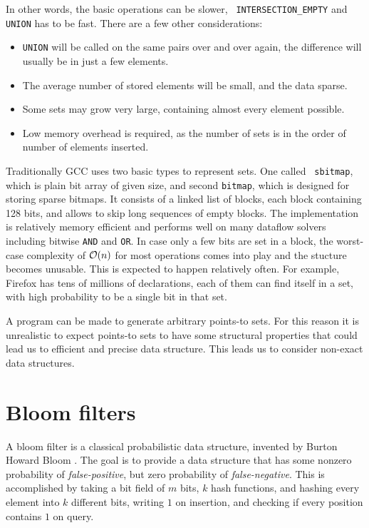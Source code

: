 In other words, the basic operations can be slower, {\tt
INTERSECTION\_EMPTY} and {\tt UNION} has to be fast. There are a few other considerations:

\begin{itemize}
	\item {\tt UNION} will be called on the same pairs over and over again,
		the difference will usually be in just a few elements.
	\item The average number of stored elements will be small, and the data sparse.
	\item Some sets may grow very large, containing almost every element possible.
	\item Low memory overhead is required, as the number of sets is in the order
		of number of elements inserted.
\end{itemize}


Traditionally GCC uses two basic types to represent sets. One called {\tt
sbitmap}, which is plain bit array of given size, and second {\tt bitmap}, which
is designed for storing sparse bitmaps. It consists of a linked list of blocks,
each block containing 128 bits, and allows to skip long sequences of empty
blocks. The implementation is relatively memory efficient and performs well on
many dataflow solvers including bitwise {\tt AND} and {\tt OR}. In case only
a few bits are set in a block, the worst-case complexity of $\mathcal{O}(n)$ for most
operations comes into play and the stucture becomes unusable.  This is expected
to happen relatively often. For example, Firefox has tens of millions of
declarations, each of them can find itself in a set, with high probability to be
a single bit in that set.

A program can be made to generate arbitrary points-to sets. For this reason it
is unrealistic to expect points-to sets to have some structural properties that
could lead us to efficient and precise data structure. This leads us to consider
non-exact data structures.

\section{Bloom filters}

A bloom filter is a classical probabilistic data structure, invented by Burton
Howard Bloom \cite{Bloom1970}. The goal is to provide a data structure
that has some nonzero probability of {\it false-positive}, but zero probability
of {\it false-negative}. This is accomplished by taking a bit field of $m$ bits,
$k$ hash functions, and hashing every element into $k$ different bits, writing
$1$ on insertion, and checking if every position contains $1$ on query.

